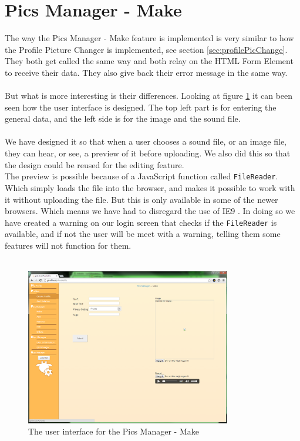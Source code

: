 \section{Pics Manager - Make}
The way the Pics Manager - Make feature is implemented is very similar to how the Profile Picture Changer is implemented, see section \ref{sec:profilePicChange}.\\
They both get called the same way and both relay on the HTML Form Element to receive their data. They also give back their error message in the same way.\\
\\
But what is more interesting is their differences. Looking at figure \ref{fig:picsManagerMake} it can been seen how the user interface is designed. The top left part is for entering the general data, and the left side is for the image and the sound file.\\
\\
We have designed it so that when a user chooses a sound file, or an image file, they can hear, or see, a preview of it before uploading. We also did this so that the design could be reused for the editing feature.\\
The preview is possible because of a JavaScript function called \texttt{FileReader}. Which simply loads the file into the browser, and makes it possible to work with it without uploading the file. But this is only available in some of the newer browsers. Which means we have had to disregard the use of IE9 \citep{canIUse}. In doing so we have created a warning on our login screen that checks if the \texttt{FileReader} is available, and if not the user will be meet with a warning, telling them some features will not function for them.\\
\\
\begin{figure}[htbp]
	\centering
		\includegraphics[width=0.80\textwidth]{images/picsManagerMake.png}
	\caption{The user interface for the Pics Manager - Make}
	\label{fig:picsManagerMake}
\end{figure}

